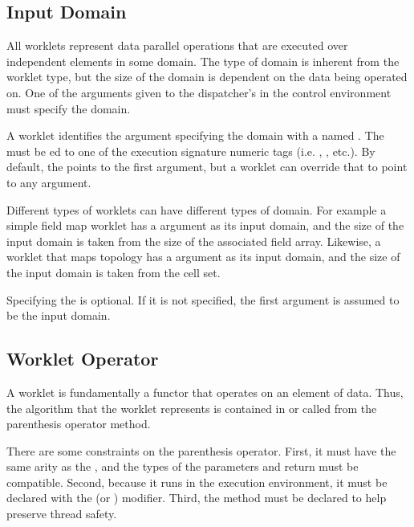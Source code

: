 \subsection{Input Domain}
\label{sec:InputDomain}


All worklets represent data parallel operations that are executed over
independent elements in some domain. The type of domain is inherent from
the worklet type, but the size of the domain is dependent on the data being
operated on. One of the arguments given to the dispatcher's
 in the control environment must specify the domain.

A worklet identifies the argument specifying the domain with a
 named . The  must be
ed to one of the execution signature numeric tags
(i.e. , , etc.). By default, the 
points to the first argument, but a worklet can override that to point to
any argument.


Different types of worklets can have different types of domain. For example
a simple field map worklet has a  argument as its input
domain, and the size of the input domain is taken from the size of the
associated field array. Likewise, a worklet that maps topology has a
 argument as its input domain, and the size of the input
domain is taken from the cell set.

Specifying the  is optional. If it is not specified, the first
argument is assumed to be the input domain.


\subsection{Worklet Operator}
\label{sec:WorkletOperator}

A worklet is fundamentally a functor that operates on an element of data.
Thus, the algorithm that the worklet represents is contained in or called
from the parenthesis operator method.


There are some constraints on the parenthesis operator. First, it must have
the same arity as the \executionsignature, and the types of the parameters
and return must be compatible. Second, because it runs in the execution
environment, it must be declared with the \vtkmexecexport (or
\vtkmexeccontexport) modifier. Third, the method must be declared
 to help preserve thread safety.

